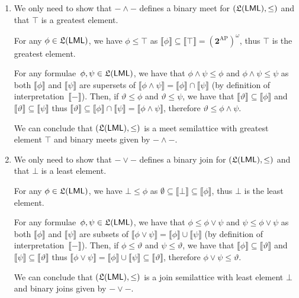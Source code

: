 \documentclass[fontsize=16pt,a4paper,DIV=17,parskip=half]{scrartcl}
\renewcommand{\mathsf}[1]{\textup{\textsf{#1}}}
\theoremstyle{definition}
\begin{document}
  \begin{enumerate}
    \item We only need to show that $- \wedge -$ defines a binary meet for $(\mathfrak L(\mathsf{LML}), \le)$ and that $\top$ is a greatest element.

      For any $\phi \in \mathfrak L(\mathsf{LML})$, we have $\phi \le \top$ as $\llbracket \phi\rrbracket \subseteq \llbracket \top\rrbracket = (\mathbf{2}^\mathrm{AP})^\omega$, thus $\top$ is the greatest element.

      For any formulae~$\phi, \psi \in \mathfrak L(\mathsf{LML})$, we have that $\phi \land \psi \le \phi$ and $\phi \land \psi \le \psi$ as both $\llbracket \phi\rrbracket  $ and $\llbracket \psi\rrbracket  $ are supersets of $\llbracket \phi \land \psi\rrbracket = \llbracket \phi\rrbracket  \cap \llbracket \psi\rrbracket$ (by definition of interpretation~$\llbracket -\rrbracket$).
      Then, if $\vartheta \le \phi$ and $\vartheta \le \psi$, we have that $\llbracket \vartheta\rrbracket \subseteq \llbracket \phi\rrbracket$ and $\llbracket \vartheta\rrbracket \subseteq \llbracket \psi\rrbracket$ thus $\llbracket \vartheta\rrbracket \subseteq \llbracket \phi\rrbracket \cap \llbracket \psi\rrbracket = \llbracket \phi \land \psi\rrbracket$, therefore $\vartheta \le \phi\land\psi$.

      We can conclude that $(\mathfrak L(\mathsf{LML}), \le)$ is a meet semilattice with greatest element $\top$ and binary meets given by $- \wedge -$.

    \item We only need to show that $- \vee -$ defines a binary join for $(\mathfrak L(\mathsf{LML}), \le)$ and that $\bot$ is a least element.

      For any $\phi \in \mathfrak L(\mathsf{LML})$, we have $\bot \le \phi$ as $\emptyset \subseteq \llbracket \bot\rrbracket \subseteq \llbracket \phi\rrbracket$, thus $\bot$ is the least element.

      For any formulae~$\phi, \psi \in \mathfrak L(\mathsf{LML})$, we have that $\phi \le \phi \lor \psi$ and $\psi\le \phi \lor \psi$ as both $\llbracket \phi\rrbracket$ and $\llbracket \psi\rrbracket  $ are subsets of $\llbracket \phi \lor \psi\rrbracket = \llbracket \phi\rrbracket  \cup \llbracket \psi\rrbracket$ (by definition of interpretation~$\llbracket -\rrbracket$).
      Then, if $\phi \le \vartheta $ and $\psi \le \vartheta $, we have that $\llbracket \phi\rrbracket \subseteq \llbracket \vartheta\rrbracket$ and $\llbracket \psi\rrbracket \subseteq \llbracket \vartheta\rrbracket$ thus $\llbracket \phi \lor \psi \rrbracket = \llbracket \phi\rrbracket \cup \llbracket \psi\rrbracket  \subseteq \llbracket \vartheta\rrbracket$, therefore $\phi \lor \psi \le \vartheta$.

      We can conclude that $(\mathfrak L(\mathsf{LML}), \le)$ is a join semilattice with least element $\bot$ and binary joins given by $- \vee -$.
  \end{enumerate}
\end{document}
